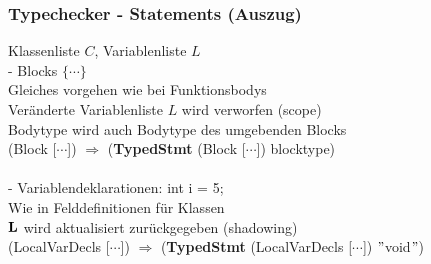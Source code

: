 \begin{frame}
    \frametitle{Typechecker - Statements (Auszug)}
Klassenliste $C$, Variablenliste $L$ \\
- Blocks $\{ \cdots \}$\\
Gleiches vorgehen wie bei Funktionsbodys \\
Veränderte Variablenliste $L$ wird verworfen (scope) \\
Bodytype wird auch Bodytype des umgebenden Blocks \\
(Block [$\cdots$]) $\Rightarrow$ ({\bf TypedStmt} (Block [$\cdots$]) blocktype) \\
\ \\
- Variablendeklarationen: int i = 5;\\
Wie in Felddefinitionen für Klassen \\
${\bf L}$ wird aktualisiert zurückgegeben (shadowing) \\
(LocalVarDecls [$\cdots$]) $\Rightarrow$ ({\bf TypedStmt} (LocalVarDecls [$\cdots$]) $"$void$"$)
\end{frame}